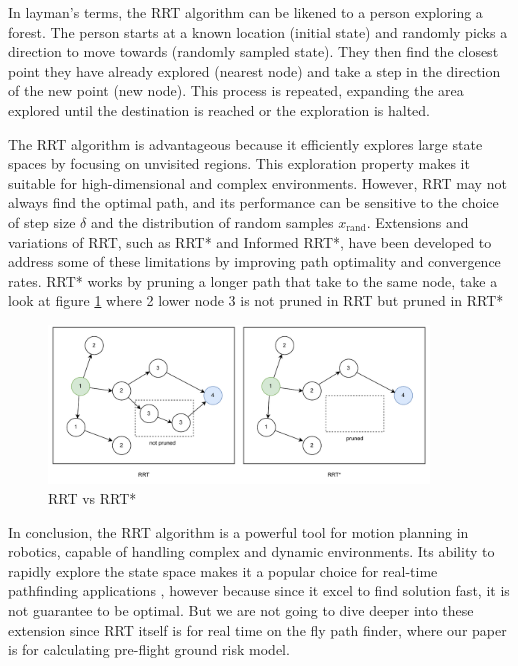 \documentclass[12pt]{report}
\begin{document}
        In layman's terms, the RRT algorithm can be likened to a person exploring a forest. The person starts at a known
        location (initial state) and randomly picks a direction to move towards (randomly sampled state). They then find
        the closest point they have already explored (nearest node) and take a step in the direction of the new point
        (new node). This process is repeated, expanding the area explored until the destination is reached or the
        exploration is halted.
       
        The RRT algorithm is advantageous because it efficiently explores large state spaces by focusing on unvisited
        regions. This exploration property makes it suitable for high-dimensional and complex environments. However, RRT
        may not always find the optimal path, and its performance can be sensitive to the choice of step size \( \delta
        \) and the distribution of random samples \( x_{\text{rand}} \). Extensions and variations of RRT, such as RRT*
        and Informed RRT*, have been developed to address some of these limitations by improving path optimality and
        convergence rates. RRT* works by pruning a longer path that take to the same node, take a look at figure
        \ref{fig:rrtstar} where 2 lower node 3 is not pruned in RRT but pruned in RRT*

        \begin{figure}[H]
            \centering
            \includegraphics[width=0.9\textwidth]{General Image/OSM Drone-RRTvsRRTstar.pdf}
            \caption{RRT vs RRT*}
            \label{fig:rrtstar}
        \end{figure}
        
       
        In conclusion, the RRT algorithm is a powerful tool for motion planning in robotics, capable of handling complex
        and dynamic environments. Its ability to rapidly explore the state space makes it a popular choice for real-time
        pathfinding applications \cite{lavalle_planning_2006}, however because since it excel to find solution fast, it
        is not guarantee to be optimal. But we are not going to dive deeper into these extension since RRT itself is for
        real time on the fly path finder, where our paper is for calculating pre-flight ground risk model.
\end{document}
